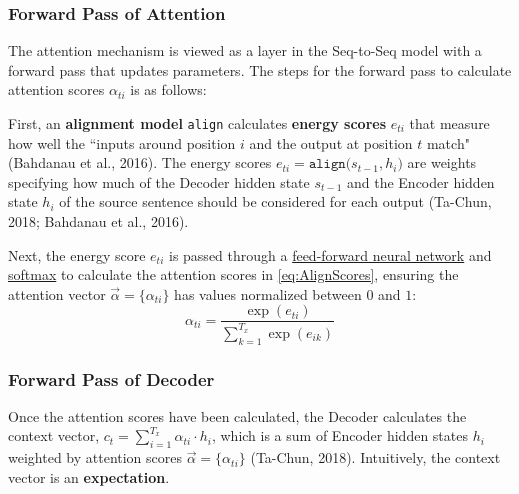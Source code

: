 \subsubsection{Forward Pass of Attention}

The attention mechanism is viewed as a layer in the Seq-to-Seq model with a forward pass that updates parameters. The steps for the forward pass to calculate attention scores $\alpha_{ti}$ is as follows: 

\begin{enumerateSpaced}{3pt}
    \item First, an \textbf{alignment model} \texttt{align} calculates \textbf{energy scores} $e_{ti}$ that measure how well the ``inputs around position $i$ and the output at position $t$ match" (Bahdanau et al., 2016). The energy scores $e_{ti} = \texttt{align} \Big(s_{t-1}, h_i \Big)$ are weights specifying how much of the Decoder hidden state $s_{t-1}$ and the Encoder hidden state $h_i$ of the source sentence should be considered for each output (Ta-Chun, 2018; Bahdanau et al., 2016). 
    
    \item Next, the energy score $e_{ti}$ is passed through a \hyperref[sec:NeuralLM]{feed-forward neural network} and \hyperref[cnc:softmaxLayer]{softmax} to calculate the attention scores in \cref{eq:AlignScores}, ensuring the attention vector $\overrightarrow{\alpha} = \Big \{ \alpha_{ti} \Big \}$ has values normalized between $0$ and $1$:
    \begin{equation}
    \alpha_{ti} = \frac{\exp{(e_{ti})} } { \sum_{k=1}^{T_x} \exp{(e_{ik})} } 
    \label{eq:AlignScores}
    \end{equation}
\end{enumerateSpaced}


\subsubsection{Forward Pass of Decoder}

Once the attention scores have been calculated, the Decoder calculates the context vector, $c_t = \sum_{i=1}^{T_x} \alpha_{ti} \cdot h_i$, which is a sum of Encoder hidden states $h_i$ weighted by attention scores $\overrightarrow{\alpha} = \Big \{ \alpha_{ti} \Big \}$ (Ta-Chun, 2018). Intuitively, the context vector is an \textbf{expectation}. 


